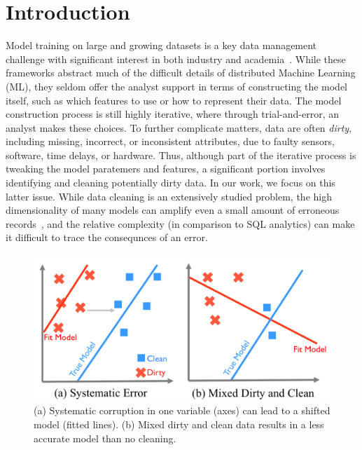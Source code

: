\section{Introduction}
Model training on large and growing datasets is a key data management challenge with significant interest in both industry and academia~\cite{bdas, alexandrov2014stratosphere, crotty2014tupleware, tensor}.
While these frameworks abstract much of the difficult details of distributed Machine Learning (ML), they seldom offer the analyst support in terms of constructing the model itself, such as which features to use or how to represent their data.
The model construction process is still highly iterative, where through trial-and-error, an analyst makes these choices. 
To further complicate matters, data are often \emph{dirty}, including missing, incorrect, or inconsistent attributes, due to faulty sensors, software, time delays, or hardware.
Thus, although part of the iterative process is tweaking the model paratemers and features, a significant portion involves identifying and cleaning potentially dirty data.  
In our work, we focus on this latter issue. 
While data cleaning is an extensively studied problem, the high dimensionality of many models can amplify even a small amount of erroneous records~\cite{xiaofeature}, and the relative complexity (in comparison to SQL analytics) can make it difficult to trace the consequnces of an error.

\begin{figure}[t]
\centering
 \includegraphics[width=\columnwidth]{figs/update-arch.png}
 \caption{(a) Systematic corruption in one variable (axes) can lead to a shifted model (fitted lines). 
 (b) Mixed dirty and clean data results in a less accurate model than no cleaning.\label{update-arch1}}\vspace{-1em}
\end{figure}

